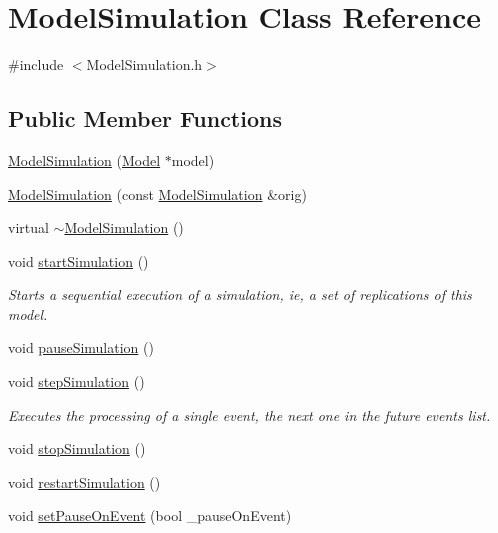 \hypertarget{class_model_simulation}{}\section{Model\+Simulation Class Reference}
\label{class_model_simulation}


{\ttfamily \#include $<$Model\+Simulation.\+h$>$}

\subsection*{Public Member Functions}
\begin{DoxyCompactItemize}
\item 
\hyperlink{class_model_simulation_a273434a2086791805d46aef9afadd24d}{Model\+Simulation} (\hyperlink{class_model}{Model} $\ast$model)
\item 
\hyperlink{class_model_simulation_a5858ba409b91834ee922985d1ccd8feb}{Model\+Simulation} (const \hyperlink{class_model_simulation}{Model\+Simulation} \&orig)
\item 
virtual \hyperlink{class_model_simulation_a9ca43a1faf5b4f3bc4f4934024e4d5f1}{$\sim$\+Model\+Simulation} ()
\item 
void \hyperlink{class_model_simulation_a22ea961f3242d4466dc0cf392c66d5e9}{start\+Simulation} ()
\begin{DoxyCompactList}\small\item\em Starts a sequential execution of a simulation, ie, a set of replications of this model. \end{DoxyCompactList}\item 
void \hyperlink{class_model_simulation_a6ceaa12581ed433b97452958dfd3371b}{pause\+Simulation} ()
\item 
void \hyperlink{class_model_simulation_a68e02df4b71756d360ca0e25464447be}{step\+Simulation} ()
\begin{DoxyCompactList}\small\item\em Executes the processing of a single event, the next one in the future events list. \end{DoxyCompactList}\item 
void \hyperlink{class_model_simulation_a8ee10a8bee6b90b91aba1c5ee62f0f36}{stop\+Simulation} ()
\item 
void \hyperlink{class_model_simulation_a0fd9ccdaf26dbf79daedfece08d9f0ea}{restart\+Simulation} ()
\item 
void \hyperlink{class_model_simulation_a1af329d915189bd4f295d9d1439c0fd1}{set\+Pause\+On\+Event} (bool \+\_\+pause\+On\+Event)

\end{DoxyCompactItemize}
